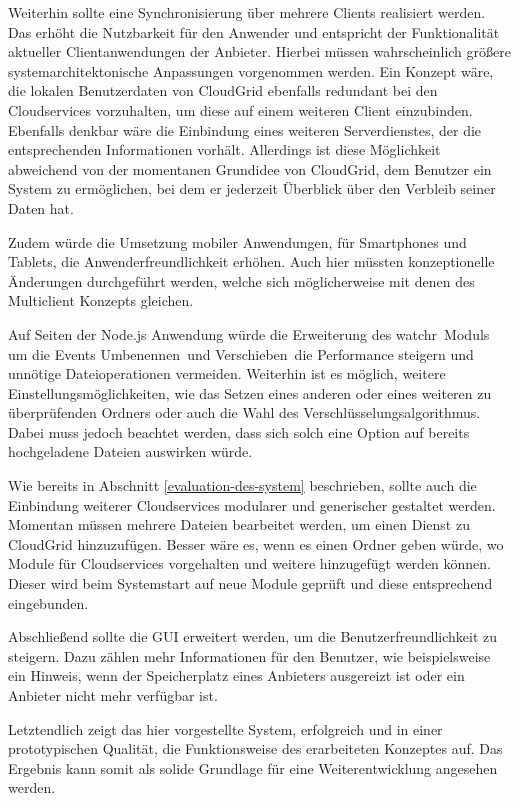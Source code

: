 Weiterhin sollte eine Synchronisierung über mehrere Clients realisiert werden.
Das erhöht die Nutzbarkeit für den Anwender und entspricht der Funktionalität aktueller Clientanwendungen der Anbieter.
Hierbei müssen wahrscheinlich größere systemarchitektonische Anpassungen vorgenommen werden.
Ein Konzept wäre, die lokalen Benutzerdaten von CloudGrid ebenfalls redundant bei den Cloudservices vorzuhalten, um diese auf einem weiteren Client einzubinden.
Ebenfalls denkbar wäre die Einbindung eines weiteren Serverdienstes, der die entsprechenden Informationen vorhält.
Allerdings ist diese Möglichkeit abweichend von der momentanen Grundidee von CloudGrid, dem Benutzer ein System zu ermöglichen, bei dem er jederzeit Überblick über den Verbleib seiner Daten hat.

Zudem würde die Umsetzung mobiler Anwendungen, für Smartphones und Tablets, die Anwenderfreundlichkeit erhöhen.
Auch hier müssten konzeptionelle Änderungen durchgeführt werden, welche sich möglicherweise mit denen des Multiclient Konzepts gleichen.

Auf Seiten der Node.js Anwendung würde die Erweiterung des \frqq watchr\flqq\ Moduls um die Events \frqq Umbenennen\flqq\ und \frqq Verschieben\flqq\ die Performance steigern und unnötige Dateioperationen vermeiden.
Weiterhin ist es möglich, weitere Einstellungsmöglichkeiten, wie das Setzen eines anderen oder eines weiteren zu überprüfenden Ordners oder auch die Wahl des Verschlüsselungsalgorithmus.
Dabei muss jedoch beachtet werden, dass sich solch eine Option auf bereits hochgeladene Dateien auswirken würde.

Wie bereits in Abschnitt \ref{evaluation-des-system} beschrieben, sollte auch die Einbindung weiterer Cloudservices modularer und generischer gestaltet werden.
Momentan müssen mehrere Dateien bearbeitet werden, um einen Dienst zu CloudGrid hinzuzufügen.
Besser wäre es, wenn es einen Ordner geben würde, wo Module für Cloudservices vorgehalten und weitere hinzugefügt werden können.
Dieser wird beim Systemstart auf neue Module geprüft und diese entsprechend eingebunden.

Abschließend sollte die \ac{GUI} erweitert werden, um die Benutzerfreundlichkeit zu steigern.
Dazu zählen mehr Informationen für den Benutzer, wie beispielsweise ein Hinweis, wenn der Speicherplatz eines Anbieters ausgereizt ist oder ein Anbieter nicht mehr verfügbar ist.

Letztendlich zeigt das hier vorgestellte System, erfolgreich und in einer prototypischen Qualität, die Funktionsweise des erarbeiteten Konzeptes auf.
Das Ergebnis kann somit als solide Grundlage für eine Weiterentwicklung angesehen werden.